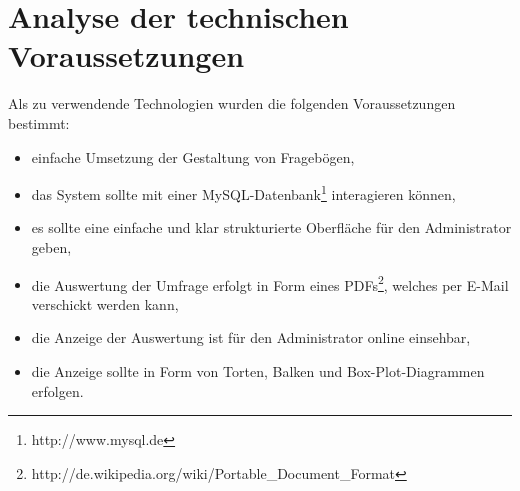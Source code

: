 \section{Analyse der technischen Voraussetzungen}
Als zu verwendende Technologien wurden die folgenden Voraussetzungen bestimmt:
\begin{itemize}
 \item einfache Umsetzung der Gestaltung von Fragebögen,
 \item das System sollte mit einer MySQL-Datenbank\footnote{http://www.mysql.de} interagieren können,
 \item es sollte eine einfache und klar strukturierte Oberfläche für den Administrator geben,
 \item die Auswertung der Umfrage erfolgt in Form eines PDFs\footnote{http://de.wikipedia.org/wiki/Portable\_Document\_Format}, welches per E-Mail verschickt werden kann,
 \item die Anzeige der Auswertung ist für den Administrator online einsehbar,
 \item die Anzeige sollte in Form von Torten, Balken und Box-Plot-Diagrammen erfolgen.
\end{itemize}
